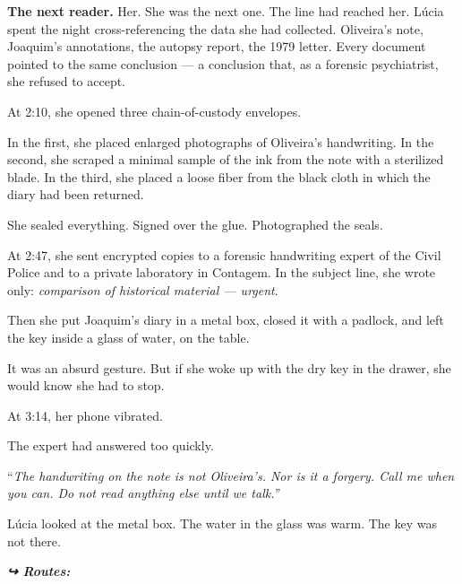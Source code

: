 \noindent \textbf{The next reader.}
\noindent Her.
\noindent She was the next one.
\noindent The line had reached her.
\noindent Lúcia spent the night cross-referencing the data she had collected. Oliveira's note, Joaquim's annotations, the autopsy report, the 1979 letter. Every document pointed to the same conclusion --- a conclusion that, as a forensic psychiatrist, she refused to accept.

\noindent At 2:10, she opened three chain-of-custody envelopes.

\noindent In the first, she placed enlarged photographs of Oliveira's handwriting.
\noindent In the second, she scraped a minimal sample of the ink from the note with a sterilized blade.
\noindent In the third, she placed a loose fiber from the black cloth in which the diary had been returned.

\noindent She sealed everything. Signed over the glue. Photographed the seals.

\noindent At 2:47, she sent encrypted copies to a forensic handwriting expert of the Civil Police and to a private laboratory in Contagem. In the subject line, she wrote only: \textit{comparison of historical material --- urgent}.

\noindent Then she put Joaquim's diary in a metal box, closed it with a padlock, and left the key inside a glass of water, on the table.

\noindent It was an absurd gesture. But if she woke up with the dry key in the drawer, she would know she had to stop.

\noindent At 3:14, her phone vibrated.

\noindent The expert had answered too quickly.

\noindent \textquotedblleft{\textit{The handwriting on the note is not Oliveira's. Nor is it a forgery. Call me when you can. Do not read anything else until we talk.\textquotedblright}}

\noindent Lúcia looked at the metal box. The water in the glass was warm. The key was not there.




\vspace{0.5em}
\noindent\textit{\textbf{↪ Routes:}  \rotasep {} \rotasep {}}
